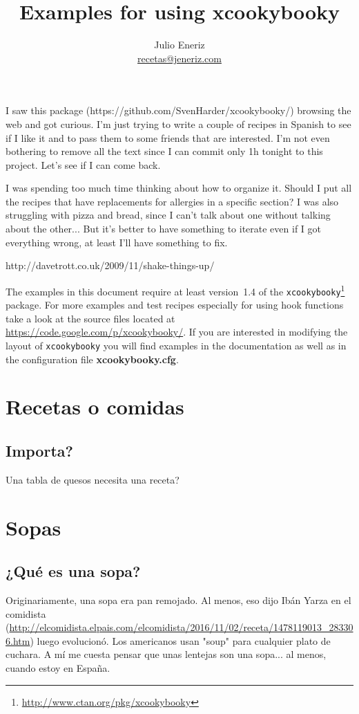 \documentclass[%
a4paper,
twoside,
14pt
]{book}
\begin{document}
\title{Examples for using \textbf{xcookybooky}}
\author{Julio Eneriz\\ \href{mailto:recetas@jeneriz.com}{recetas@jeneriz.com}}
\maketitle

\noindent I saw this package (https://github.com/SvenHarder/xcookybooky/) browsing the web and got curious. I'm just trying to write a couple of recipes in Spanish to see if I like it and to pass them to some friends that are interested. I'm not even bothering to remove all the text since I can commit only 1h tonight to this project. Let's see if I can come back.

\noindent I was spending too much time thinking about how to organize it. Should I put all the recipes that have replacements for allergies in a specific section? I was also struggling with pizza and bread, since I can't talk about one without talking about the other... But it's better to have something to iterate even if I got everything wrong, at least I'll have something to fix.

http://davetrott.co.uk/2009/11/shake-things-up/

    \noindent The examples in this document require at least version~1.4 of the \texttt{xcookybooky}\footnote{\url{http://www.ctan.org/pkg/xcookybooky}} package. For more examples and test recipes especially for using hook functions take a look at the source files located at \url{https://code.google.com/p/xcookybooky/}. If you are interested in modifying the layout of \texttt{xcookybooky} you will find examples in the documentation as well as in the configuration file \textbf{xcookybooky.cfg}.

\tableofcontents

\vspace{5em}
\chapter{Recetas o comidas}
\section{Importa?}
Una tabla de quesos necesita una receta? 

\chapter{Sopas}
\section{¿Qué es una sopa?}
Originariamente, una sopa era pan remojado. Al menos, eso dijo Ibán Yarza en el comidista (\url{http://elcomidista.elpais.com/elcomidista/2016/11/02/receta/1478119013_283306.htm}) luego evolucionó. Los americanos usan "soup" para cualquier plato de cuchara. A mí me cuesta pensar que unas lentejas son una sopa... al menos, cuando estoy en España.
\end{document}
